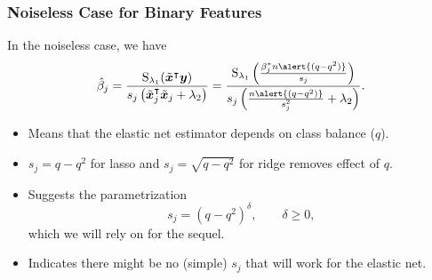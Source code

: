 \documentclass[aspectratio=1610,onlytextwidth]{beamer}
\begin{document}
\begin{frame}[c]
  \frametitle{Noiseless Case for Binary Features}

  In the noiseless case, we have
  \[
    \hat{\beta}_j = \frac{\st_{\lambda_1}(\tilde{\vec{x}}^\intercal \vec{y})}{s_j\left(\tilde{\vec{x}}_j^\intercal \tilde{\vec{x}}_j + \lambda_2\right)}
    =
    \frac{\operatorname{S}_{\lambda_1}\left(\frac{\beta_j^* n \alert{(q - q^2)}}{s_j}\right)}{s_j\left(\frac{n\alert{(q - q^2)}}{s_j^2} + \lambda_2\right)}.
  \]
  \pause
  \begin{itemize}[<+->]
    \item Means that the elastic net estimator depends on class balance (\(q\)).
    \item \(s_j = q - q^2\) for lasso and \(s_j = \sqrt{q-q^2}\) for ridge removes effect of \(q\).
    \item Suggests the parametrization
          \[
            s_j = (q - q^2)^\delta, \qquad \delta \geq 0,
          \]
          which we will rely on for the sequel.
    \item Indicates there might be no (simple) \(s_j\) that will work for the elastic net.
  \end{itemize}
\end{frame}

%
%
%
%
%
%
\end{document}
